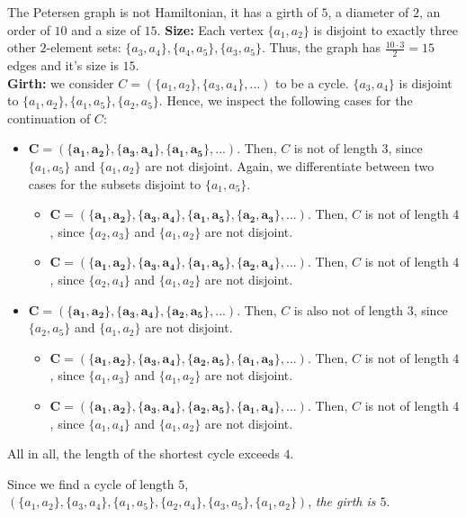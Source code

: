 \documentclass[a4paper]{article}
\begin{document}
\begin{solution}{9}
\begin{theorem}{The Petersen graph is not Hamiltonian, it has a girth of $5$, a diameter of $2$, an order of $10$ and a size of $15$.}
			\textbf{Size:} Each vertex $\{a_1, a_2\}$ is disjoint to exactly three other $2$-element sets: $\{a_3, a_4\}, \{a_4, a_5\}, \{a_3, a_5\}$. Thus, the graph has $\frac{10 \cdot 3}{2} = 15$ edges and it's size is $15$.\\

			\textbf{Girth:} we consider $C = (\{a_1, a_2\}, \{a_3, a_4\}, ...)$ to be a cycle. $\{a_3, a_4\}$ is disjoint to $\{a_1, a_2\}, \{a_1, a_5\}, \{a_2, a_5\}$. Hence, we inspect the following cases for the continuation of $C$:
			\begin{itemize}
				\item $\mathbf{C = (\{a_1, a_2\}, \{a_3, a_4\}, \{a_1, a_5\}, ...)}$. Then, $C$ is not of length $3$, since $\{a_1, a_5\}$ and $\{a_1, a_2\}$ are not disjoint. Again, we differentiate between two cases for the subsets disjoint to $\{a_1, a_5\}$.
					\begin{itemize}
						\item $\mathbf{C = (\{a_1, a_2\}, \{a_3, a_4\}, \{a_1, a_5\}, \{a_2, a_3\}, ...)}$. Then, $C$ is not of length $4$, since $\{a_2, a_3\}$ and $\{a_1, a_2\}$ are not disjoint.
						\item $\mathbf{C = (\{a_1, a_2\}, \{a_3, a_4\}, \{a_1, a_5\}, \{a_2, a_4\}, ...)}$. Then, $C$ is not of length $4$, since $\{a_2, a_4\}$ and $\{a_1, a_2\}$ are not disjoint.
					\end{itemize}
				\item $\mathbf{C = (\{a_1, a_2\}, \{a_3, a_4\}, \{a_2, a_5\}, ...)}$. Then, $C$ is also not of length $3$, since $\{a_2, a_5\}$ and $\{a_1, a_2\}$ are not disjoint.
					\begin{itemize}
						\item $\mathbf{C = (\{a_1, a_2\}, \{a_3, a_4\}, \{a_2, a_5\}, \{a_1, a_3\}, ...)}$. Then, $C$ is not of length $4$, since $\{a_1, a_3\}$ and $\{a_1, a_2\}$ are not disjoint.
						\item $\mathbf{C = (\{a_1, a_2\}, \{a_3, a_4\}, \{a_2, a_5\}, \{a_1, a_4\}, ...)}$. Then, $C$ is not of length $4$, since $\{a_1, a_4\}$ and $\{a_1, a_2\}$ are not disjoint.
					\end{itemize}
			\end{itemize}
			All in all, the length of the shortest cycle exceeds $4$.

			Since we find a cycle of length $5$, $(\{a_1, a_2\}, \{a_3, a_4\}, \{a_1, a_5\}, \{a_2, a_4\}, \{a_3, a_5\}, \{a_1, a_2\})$, \emph{the girth is $5$}.\\


\end{theorem}
\end{solution}
\end{document}
